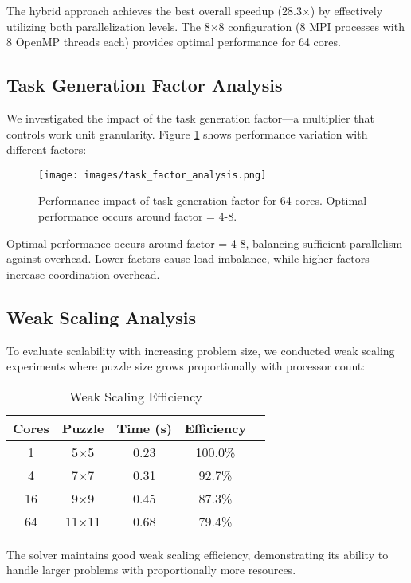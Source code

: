 The hybrid approach achieves the best overall speedup (28.3×) by effectively utilizing both parallelization levels. The 8×8 configuration (8 MPI processes with 8 OpenMP threads each) provides optimal performance for 64 cores.

\subsection{Task Generation Factor Analysis}
We investigated the impact of the task generation factor—a multiplier that controls work unit granularity. Figure \ref{fig:task_factor} shows performance variation with different factors:

\begin{figure}[htbp]
\centering
\texttt{[image: images/task\_factor\_analysis.png]}
\caption{Performance impact of task generation factor for 64 cores. Optimal performance occurs around factor = 4-8.}
\label{fig:task_factor}
\end{figure}

Optimal performance occurs around factor = 4-8, balancing sufficient parallelism against overhead. Lower factors cause load imbalance, while higher factors increase coordination overhead.

\subsection{Weak Scaling Analysis}
To evaluate scalability with increasing problem size, we conducted weak scaling experiments where puzzle size grows proportionally with processor count:

\begin{table}[htbp]
\caption{Weak Scaling Efficiency}
\begin{center}
\begin{tabular}{@{}ccccc@{}}
\toprule
\textbf{Cores} & \textbf{Puzzle} & \textbf{Time (s)} & \textbf{Efficiency} \\
\midrule
1 & 5×5 & 0.23 & 100.0\% \\
4 & 7×7 & 0.31 & 92.7\% \\
16 & 9×9 & 0.45 & 87.3\% \\
64 & 11×11 & 0.68 & 79.4\% \\
\bottomrule
\end{tabular}
\end{center}
\label{tab:weak_scaling}
\end{table}

The solver maintains good weak scaling efficiency, demonstrating its ability to handle larger problems with proportionally more resources.

